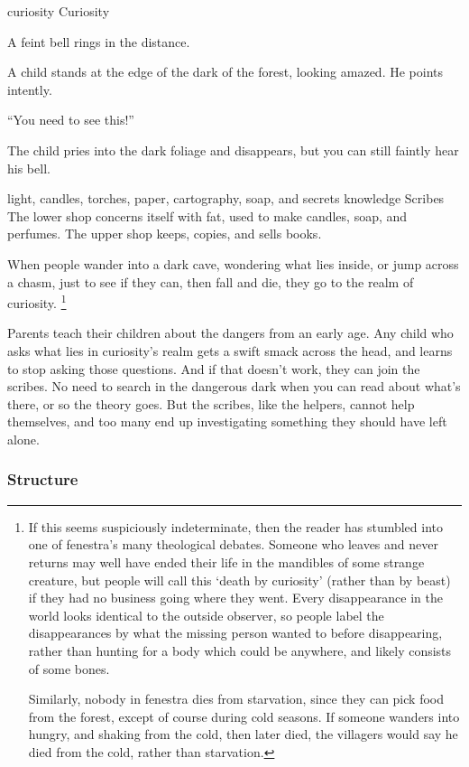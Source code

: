 \begin{multicols}{2}
  {\gls{curiosity}}%
  {Curiosity}%
  {
    A feint bell rings in the distance.

    A child stands at the edge of the dark of the forest, looking amazed.
    He points intently.

    {\sffamily``You need to see this!''}

    The child pries into the dark foliage and disappears, but you can still faintly hear his bell.
  }%
  {light, candles, torches, paper, cartography, soap, and secrets}%
  {knowledge}%
  {Scribes}%
  {
    The lower shop concerns itself with fat, used to make candles, soap, and perfumes.
    The upper shop keeps, copies, and sells books.
  }%

When people wander into a dark cave, wondering what lies inside, or jump across a chasm, just to see if they can, then fall and die, they go to the realm of curiosity.
\ignorespaces\footnote{If this seems suspiciously indeterminate, then the reader has stumbled into one of \gls{fenestra}'s many theological debates.
Someone who leaves and never returns may well have ended their life in the mandibles of some strange creature, but people will call this `death by curiosity' (rather than by beast) if they had no business going where they went.
Every disappearance in the world looks identical to the outside observer, so people label the disappearances by what the missing person wanted to before disappearing, rather than hunting for a body which could be anywhere, and likely consists of some bones.

Similarly, nobody in \gls{fenestra} dies from starvation, since they can pick food from the forest, except of course during cold seasons.
If someone wanders into  hungry, and shaking from the cold, then later died, the villagers would say he died from the cold, rather than starvation.}

Parents teach their children about the dangers from an early age.
Any child who asks what lies in curiosity's realm gets a swift smack across the head, and learns to stop asking those questions.
And if that doesn't work, they can join the scribes.
No need to search in the dangerous dark when you can read about what's there, or so the theory goes.
But the scribes, like the helpers, cannot help themselves, and too many end up investigating something they should have left alone.

\subsubsection{Structure}


\end{multicols}
